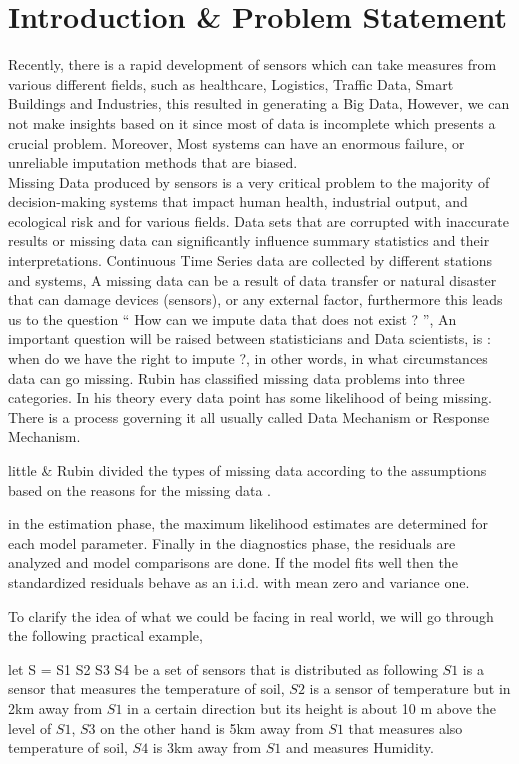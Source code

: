 \chapter{Introduction \&  Problem Statement } 

Recently, there is a rapid development of  sensors which  can take measures from various different fields, such as  healthcare, Logistics, Traffic Data, Smart Buildings and Industries, this resulted in generating a Big Data, However, we can not make insights based on it since most of data is incomplete which presents a crucial problem\cite{dempetrubin}. Moreover, Most systems can have an enormous failure, or unreliable imputation methods that are biased.\\Missing Data produced by sensors is a very  critical problem to the majority of decision-making systems that impact human health, industrial output, and ecological risk and  for various fields. Data sets that are corrupted with inaccurate results or missing data can significantly influence summary statistics and their interpretations. Continuous Time Series data are collected by different stations and systems, A missing data can be a result of data transfer or natural disaster that can damage devices (sensors), or any external factor, furthermore this leads us to the question “ How can we impute data that does not exist ? ”, An important question will be raised between statisticians and Data scientists, is : when do we have the right to impute ?, in other words,  in what circumstances  data can go missing. Rubin \cite{rubin} has  classified missing data problems into three categories. In his theory every data point has some likelihood of being missing. There is a process governing it all usually called Data Mechanism or Response Mechanism.

little \& Rubin divided the types of missing data according to the assumptions based on the reasons for the missing data \cite{}.

in  the estimation phase, the maximum likelihood estimates are determined for each model parameter. 
Finally in the diagnostics phase, the residuals are analyzed and model comparisons are done. If the model fits well then the standardized residuals behave as an i.i.d. with mean zero and variance one.

To clarify the idea of what we could be facing in real world, we will go through the following practical example,

let S = {S1 S2 S3 S4} be a set of sensors that is distributed as following $S1$ is a sensor  that measures the temperature of soil, $S2$ is a sensor of temperature but in 2km away from $S1$ in a certain direction but its height is about 10 m above the level of $S1$, $S3$  on the other hand is 5km away from $S1$ that measures also temperature of soil,  $S4$  is 3km away from $S1$  and  measures Humidity.

